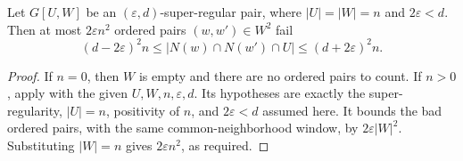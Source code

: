 \begin{lemma}
Let $G[U,W]$ be an $(\varepsilon,d)$-super-regular pair, where $|U|=|W|=n$ and $2\varepsilon<d$.  Then at most $2\varepsilon n^2$ ordered pairs $(w,w')\in W^2$ fail
\[
 (d-2\varepsilon)^2n\le |N(w)\cap N(w')\cap U|
 \le (d+2\varepsilon)^2n.
\]
\end{lemma}
\begin{proof}
If $n=0$, then $W$ is empty and there are no ordered pairs to count.
If $n>0$, apply  with
the given $U,W,n,\varepsilon,d$.  Its hypotheses are exactly the
super-regularity, $|U|=n$, positivity of $n$, and $2\varepsilon<d$
assumed here.  It bounds the bad ordered pairs, with the same
common-neighborhood window, by $2\varepsilon|W|^2$.
Substituting $|W|=n$ gives $2\varepsilon n^2$, as required.
\end{proof}
